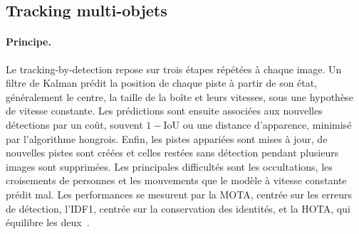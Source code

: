 \documentclass[11pt,a4paper]{article}
\begin{document}
\subsection{Tracking multi-objets}

\paragraph{Principe.} Le tracking-by-detection repose sur trois étapes répétées à chaque image. Un filtre de Kalman prédit la position de chaque piste à partir de son état, généralement le centre, la taille de la boîte et leurs vitesses, sous une hypothèse de vitesse constante. Les prédictions sont ensuite associées aux nouvelles détections par un coût, souvent $1-\mathrm{IoU}$ ou une distance d'apparence, minimisé par l'algorithme hongrois. Enfin, les pistes appariées sont mises à jour, de nouvelles pistes sont créées et celles restées sans détection pendant plusieurs images sont supprimées. Les principales difficultés sont les occultations, les croisements de personnes et les mouvements que le modèle à vitesse constante prédit mal. Les performances se mesurent par la MOTA, centrée sur les erreurs de détection, l'IDF1, centrée sur la conservation des identités, et la HOTA, qui équilibre les deux~\cite{luiten2021}.
\end{document}
